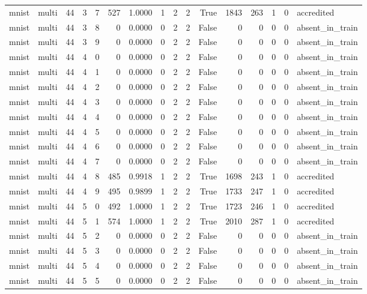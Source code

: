 \begin{tabular}{llrrrrrrrrrrrrrl}
mnist & multi & 44 & 3 & 7 & 527 & 1.0000 & 1 & 2 & 2 & True & 1843 & 263 & 1 & 0 & accredited \\
mnist & multi & 44 & 3 & 8 & 0 & 0.0000 & 0 & 2 & 2 & False & 0 & 0 & 0 & 0 & absent\_in\_train \\
mnist & multi & 44 & 3 & 9 & 0 & 0.0000 & 0 & 2 & 2 & False & 0 & 0 & 0 & 0 & absent\_in\_train \\
mnist & multi & 44 & 4 & 0 & 0 & 0.0000 & 0 & 2 & 2 & False & 0 & 0 & 0 & 0 & absent\_in\_train \\
mnist & multi & 44 & 4 & 1 & 0 & 0.0000 & 0 & 2 & 2 & False & 0 & 0 & 0 & 0 & absent\_in\_train \\
mnist & multi & 44 & 4 & 2 & 0 & 0.0000 & 0 & 2 & 2 & False & 0 & 0 & 0 & 0 & absent\_in\_train \\
mnist & multi & 44 & 4 & 3 & 0 & 0.0000 & 0 & 2 & 2 & False & 0 & 0 & 0 & 0 & absent\_in\_train \\
mnist & multi & 44 & 4 & 4 & 0 & 0.0000 & 0 & 2 & 2 & False & 0 & 0 & 0 & 0 & absent\_in\_train \\
mnist & multi & 44 & 4 & 5 & 0 & 0.0000 & 0 & 2 & 2 & False & 0 & 0 & 0 & 0 & absent\_in\_train \\
mnist & multi & 44 & 4 & 6 & 0 & 0.0000 & 0 & 2 & 2 & False & 0 & 0 & 0 & 0 & absent\_in\_train \\
mnist & multi & 44 & 4 & 7 & 0 & 0.0000 & 0 & 2 & 2 & False & 0 & 0 & 0 & 0 & absent\_in\_train \\
mnist & multi & 44 & 4 & 8 & 485 & 0.9918 & 1 & 2 & 2 & True & 1698 & 243 & 1 & 0 & accredited \\
mnist & multi & 44 & 4 & 9 & 495 & 0.9899 & 1 & 2 & 2 & True & 1733 & 247 & 1 & 0 & accredited \\
mnist & multi & 44 & 5 & 0 & 492 & 1.0000 & 1 & 2 & 2 & True & 1723 & 246 & 1 & 0 & accredited \\
mnist & multi & 44 & 5 & 1 & 574 & 1.0000 & 1 & 2 & 2 & True & 2010 & 287 & 1 & 0 & accredited \\
mnist & multi & 44 & 5 & 2 & 0 & 0.0000 & 0 & 2 & 2 & False & 0 & 0 & 0 & 0 & absent\_in\_train \\
mnist & multi & 44 & 5 & 3 & 0 & 0.0000 & 0 & 2 & 2 & False & 0 & 0 & 0 & 0 & absent\_in\_train \\
mnist & multi & 44 & 5 & 4 & 0 & 0.0000 & 0 & 2 & 2 & False & 0 & 0 & 0 & 0 & absent\_in\_train \\
mnist & multi & 44 & 5 & 5 & 0 & 0.0000 & 0 & 2 & 2 & False & 0 & 0 & 0 & 0 & absent\_in\_train \\

\end{tabular}
